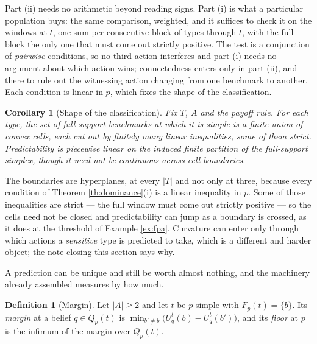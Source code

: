 \documentclass[12pt]{article}
\newtheorem{corollary}{Corollary}
\theoremstyle{definition}
\newtheorem{definition}{Definition}
\begin{document}
Part (ii) needs no arithmetic beyond reading signs. Part (i) is what a particular population buys: the same comparison, weighted, and it suffices to check it on the windows at $t$, one sum per consecutive block of types through $t$, with the full block the only one that must come out strictly positive. The test is a conjunction of \emph{pairwise} conditions, so no third action interferes and part (i) needs no argument about which action wins; connectedness enters only in part (ii), and there to rule out the witnessing action changing from one benchmark to another. Each condition is linear in $p$, which fixes the shape of the classification.

\begin{corollary}[Shape of the classification]\label{cor:pwlinear}
Fix $T$, $A$ and the payoff rule. For each type, the set of full-support benchmarks at which it is simple is a finite union of convex cells, each cut out by finitely many linear inequalities, some of them strict. Predictability is piecewise linear on the induced finite partition of the full-support simplex, though it need not be continuous across cell boundaries.
\end{corollary}

The boundaries are hyperplanes, at every $|T|$ and not only at three, because every condition of Theorem \ref{th:dominance}(i) is a linear inequality in $p$. Some of those inequalities are strict --- the full window must come out strictly positive --- so the cells need not be closed and predictability can jump as a boundary is crossed, as it does at the threshold of Example \ref{ex:fpa}. Curvature can enter only through which actions a \emph{sensitive} type is predicted to take, which is a different and harder object; the note closing this section says why.

A prediction can be unique and still be worth almost nothing, and the machinery already assembled measures by how much.

\begin{definition}[Margin]\label{def:margin}
Let $|A| \ge 2$ and let $t$ be $p$-simple with $F_p(t) = \{b\}$. Its \emph{margin} at a belief $q \in Q_p(t)$ is $\min_{b' \neq b} \bigl( U^t_q(b) - U^t_q(b') \bigr)$, and its \emph{floor} at $p$ is the infimum of the margin over $Q_p(t)$.
\end{definition}
\end{document}
